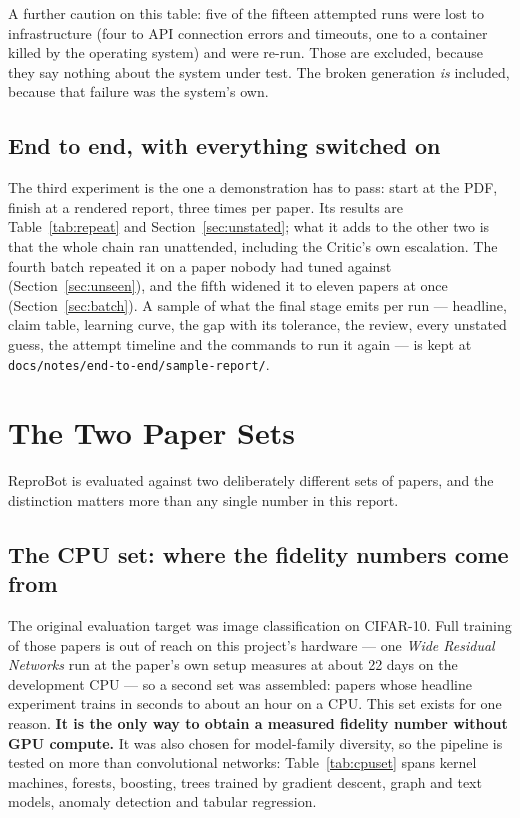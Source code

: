\documentclass[11pt]{article}
\begin{document}
A further caution on this table: five of the fifteen attempted runs were lost to infrastructure
(four to API connection errors and timeouts, one to a container killed by the operating system)
and were re-run. Those are excluded, because they say nothing about the system under test. The
broken generation \emph{is} included, because that failure was the system's own.

\subsection{End to end, with everything switched on}

The third experiment is the one a demonstration has to pass: start at the PDF, finish at a
rendered report, three times per paper. Its results are Table~\ref{tab:repeat} and
Section~\ref{sec:unstated}; what it adds to the other two is that the whole chain ran unattended,
including the Critic's own escalation. The fourth batch repeated it on a paper nobody had tuned
against (Section~\ref{sec:unseen}), and the fifth widened it to eleven papers at once
(Section~\ref{sec:batch}). A sample of what the final stage emits per run --- headline,
claim table, learning curve, the gap with its tolerance, the review, every unstated guess, the
attempt timeline and the commands to run it again --- is kept at
\texttt{docs/notes/end-to-end/sample-report/}.

\section{The Two Paper Sets}
\label{sec:sets}

ReproBot is evaluated against two deliberately different sets of papers, and the distinction
matters more than any single number in this report.

\subsection{The CPU set: where the fidelity numbers come from}

The original evaluation target was image classification on CIFAR-10. Full training of those
papers is out of reach on this project's hardware --- one \emph{Wide Residual Networks} run at the
paper's own setup measures at about 22 days on the development CPU --- so a second set was
assembled: papers whose headline experiment trains in seconds to about an hour on a CPU. This set
exists for one reason. \textbf{It is the only way to obtain a measured fidelity number without GPU
compute.} It was also chosen for model-family diversity, so the pipeline is tested on more than
convolutional networks: Table~\ref{tab:cpuset} spans kernel machines, forests, boosting, trees
trained by gradient descent, graph and text models, anomaly detection and tabular regression.
\end{document}
